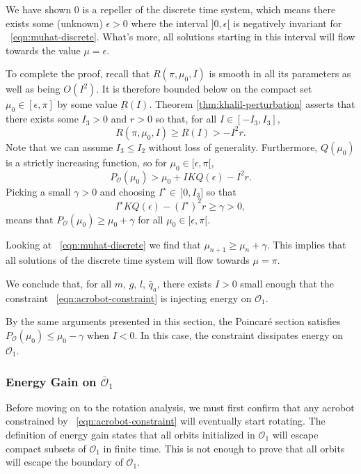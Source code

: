We have shown \(0\) is a repeller of the discrete time system, which means
there exists some (unknown) \(\epsilon > 0\) where the interval
\(]0,\epsilon[\) is negatively invariant for ~\eqref{eqn:muhat-discrete}.
What's more, all solutions starting in this interval will flow towards the value
\(\mu = \epsilon\).

To complete the proof, recall that \(R(\pi,\mu_0,I)\) is smooth in all its
parameters as well as being \(O(I^2)\).
It is therefore bounded below on the compact set \(\mu_0 \in [\epsilon,\pi]\)
by some value \(\underbar{R}(I)\). 
Theorem \ref{thm:khalil-perturbation} asserts that there exists some
\(I_3 > 0\) and \(r > 0\) so that, for all \(I \in [-I_3, I_3]\),
\[
    R(\pi,\mu_0,I) \geq \underbar{R}(I) > -I^2 r
    .
\]
Note that we can assume \(I_3 \leq I_2\) without loss of generality.
Furthermore, \(Q(\mu_0)\) is a strictly increasing function, so
for \(\mu_0 \in [\epsilon,\pi[\),
\[
    P_\mathcal{O}(\mu_0) > \mu_0 + I K Q(\epsilon) - I^2 r
    .
\]
Picking a small \(\gamma > 0\) and choosing 
\(I^\star \in\, ]0, I_3]\) so that
\[
    I^\star K Q(\epsilon) - (I^\star)^2 r \geq \gamma > 0
    ,
\]
means that \( P_\mathcal{O}(\mu_0) \geq \mu_0 + \gamma\)
for all \(\mu_0 \in [\epsilon,\pi[\).

Looking at ~\eqref{eqn:muhat-discrete} we find that
\(\mu_{n+1} \geq \mu_n + \gamma\). 
This implies that all solutions of the discrete time system will flow towards
\(\mu = \pi\).

We conclude that, for all \(m\), \(g\), \(l\), \(\bar{q}_a\), 
there exists \(I > 0\) small enough that the constraint 
~\eqref{eqn:acrobot-constraint} is injecting energy on \(\mathcal{O}_1\).

By the same arguments presented in this section, the Poincar\'{e} section
satisfies \( P_\mathcal{O}(\mu_0) \leq \mu_0 - \gamma\) when \(I < 0\). 
In this case, the constraint dissipates energy on \(\mathcal{O}_1\).

\subsubsection*{Energy Gain on \(\bar{\mathcal{O}}_1\)}
Before moving on to the rotation analysis, we must first confirm that any
acrobot constrained by ~\eqref{eqn:acrobot-constraint} will eventually start
rotating.
The definition of energy gain states that all orbits initialized in
\(\mathcal{O}_1\) will escape compact subsets of \(\mathcal{O}_1\) in finite time. 
This is not enough to prove that all orbits will escape the boundary of
\(\mathcal{O}_1\). 

